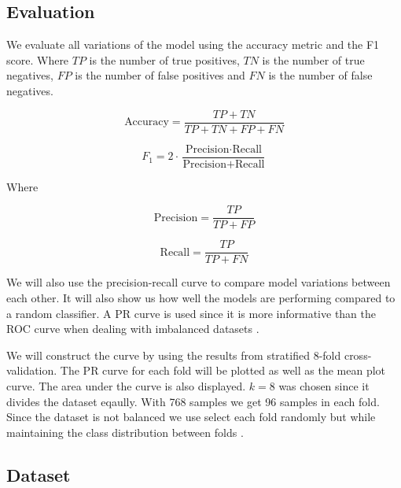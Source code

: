 


\subsection{Evaluation}

We evaluate all variations of the model using the accuracy metric and the F1 score. Where $TP$ is the number of true positives, $TN$ is the number of true negatives, $FP$ is the number of false positives and $FN$ is the number of false negatives. \cite{Marsland2015}

\begin{equation}
  \text{Accuracy} = \frac{TP + TN}{TP + TN + FP + FN}
  \label{eq:accuracy}
\end{equation}

\begin{equation}
  F_1 = 2 \cdot \frac{\text{Precision} \cdot \text{Recall}}{\text{Precision} + \text{Recall}}
  \label{eq:f1}
\end{equation} 

Where 

\begin{equation}
  \text{Precision} = \frac{TP}{TP + FP}
  \label{eq:precision}
\end{equation}

\begin{equation}
  \text{Recall} = \frac{TP}{TP + FN}
  \label{eq:recall}
\end{equation}

We will also use the precision-recall curve to compare model variations between each other. It will also show us how well the models are performing compared to a random classifier. A PR curve is used since it is more informative than the ROC curve when dealing with imbalanced datasets \cite{scikit_learn_precision_recall}. 


We will construct the curve by using the results from stratified 8-fold cross-validation. The PR curve for each fold will be plotted as well as the mean plot curve. The area under the curve is also displayed. $k=8$ was chosen since it divides the dataset eqaully. With 768 samples we get 96 samples in each fold. Since the dataset is not balanced we use select each fold randomly but while maintaining the class distribution between folds \cite{Brownlee2023, Krasnoshchek2024, Brownlee2020_imbalanced, Psteen2020}.

\subsection{Dataset}

